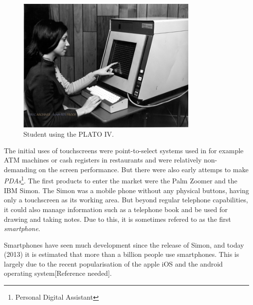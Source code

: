 \begin{figure}[]
\includegraphics[width=0.8\textwidth] {bilder/platoiv.jpg}
\caption{Student using the PLATO IV.}
\label{platoIV}
\end{figure}
\nocite{platoiv}


The initial uses of touchscreens were point-to-select systems used in for example ATM machines or cash registers in restaurants and were relatively non-demanding on the screen performance\cite{buxton}. But there were also early attemps to make \emph{PDAs}\footnote{Personal Digital Assistant}. The first products to enter the market were the Palm Zoomer and the IBM Simon. The Simon was a mobile phone without any physical buttons, having only a touchscreen as its working area. But beyond regular telephone capabilities, it could also manage information such as a telephone book and be used for drawing and taking notes. Due to this, it is sometimes refered to as the first \emph{smartphone}\cite{buxton}.

Smartphones have seen much development since the release of Simon, and today (2013) it is estimated that more than a billion people use smartphones\cite{billion1}\cite{billion2}. This is largely due to the recent popularisation of the apple iOS and the android operating system[Reference needed]. 

